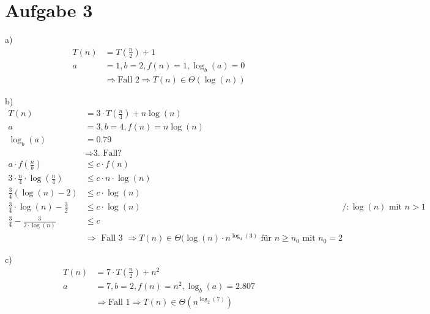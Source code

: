 \section*{Aufgabe 3}
a) \begin{align*}
	T(n) &= T\left( \frac{n}{2} \right) + 1 \\
    a &= 1, b = 2, f(n) = 1, \log_b(a) = 0 \\[0.5cm]
    &\Rightarrow \text{Fall 2} \Rightarrow T(n) \in \Theta(\log(n))
\end{align*}


b) \begin{align*}
	T(n) &= 3 \cdot T\left( \frac{n}{4} \right) + n\log(n) \\
    a &= 3, b = 4, f(n) = n\log(n) \\
    \log_b(a) &= 0.79 \\[0.5cm]
    &\Rightarrow \text{3. Fall?} \\
    a \cdot f\left( \frac{n}{b} \right) &\leq c \cdot f(n) \\
    3 \cdot \frac{n}{4} \cdot \log\left( \frac{n}{4} \right) &\leq c \cdot n \cdot \log(n) \\
    \frac{3}{4} (\log(n) - 2) &\leq c \cdot \log(n) \\
    \frac{3}{4} \cdot \log(n) - \frac{3}{2} &\leq c \cdot \log(n) &/ :\log(n) \text{ mit } n > 1 \\
    \frac{3}{4} - \frac{3}{2 \cdot \log(n)} &\leq c \\
    &\Rightarrow \text{ Fall 3 } \Rightarrow T(n) \in \Theta(\log(n)\cdot n^{\log_4(3)} \text{ für $n \geq n_0$ mit $n_0 = 2$}
\end{align*}


c) \begin{align*}
	T(n) &= 7 \cdot T\left( \frac{n}{2} \right) + n^2 \\
    a &= 7, b = 2, f(n) = n^2, \log_b(a) = 2.807 \\[0.5cm]
    &\Rightarrow \text{Fall 1} \Rightarrow T(n) \in \Theta(n^{\log_2(7)})
\end{align*}